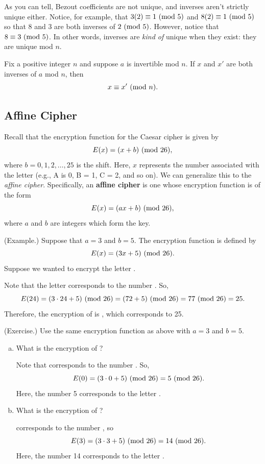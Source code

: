 \documentclass[letterpaper]{article}
\newcommand{\0}{\mathbf{0}}
\begin{document}
As you can tell, Bezout coefficients are not unique, and inverses aren't strictly unique either. Notice, for example, that $3(2) \equiv 1 \ (\mathrm{mod}\ 5)$ and $8(2) \equiv 1 \ (\mathrm{mod}\ 5)$ so that $8$ and $3$ are both inverses of $2 \ (\mathrm{mod}\ 5)$. However, notice that $8 \equiv 3 \ (\mathrm{mod}\ 5)$. In other words, inverses are \emph{kind of} unique when they exist: they are unique mod $n$. 

\begin{lemma}{}{}
    Fix a positive integer $n$ and suppose $a$ is invertible mod $n$. If $x$ and $x'$ are both inverses of $a$ mod $n$, then 
    \[x \equiv x' \ (\mathrm{mod}\ n).\]
\end{lemma}

\subsection{Affine Cipher}
Recall that the encryption function for the Caesar cipher is given by \[E(x) = (x + b) \ (\mathrm{mod}\ 26),\] where $b = 0, 1, 2, \hdots, 25$ is the shift. Here, $x$ represents the number associated with the letter (e.g., A is 0, B = 1, C = 2, and so on). We can generalize this to the \emph{affine cipher}. Specifically, an \textbf{affine cipher} is one whose encryption function is of the form \[E(x) = (ax + b) \ (\mathrm{mod}\ 26),\] where $a$ and $b$ are integers which form the key. 

\bigskip 

\begin{mdframed}
    (Example.) Suppose that $a = 3$ and $b = 5$. The encryption function is defined by \[E(x) = (3x + 5) \ (\mathrm{mod}\ 26).\] Suppose we wanted to encrypt the letter . 

    \bigskip 

    Note that the letter  corresponds to the number . So, 
    \[E(24) = (3 \cdot 24 + 5) \ (\mathrm{mod}\ 26) = (72 + 5) \ (\mathrm{mod}\ 26) = 77 \ (\mathrm{mod}\ 26) = 25.\]
    Therefore, the encryption of  is , which corresponds to 25.
\end{mdframed}

\begin{mdframed}[nobreak=true]
    (Exercise.) Use the same encryption function as above with $a = 3$ and $b = 5$.

    \begin{enumerate}[(a)]
        \item What is the encryption of ?
        \begin{mdframed}
            Note that  corresponds to the number . So, 
            \[E(0) = (3 \cdot 0 + 5) \ (\mathrm{mod}\ 26) = 5 \ (\mathrm{mod}\ 26).\]
            Here, the number 5 corresponds to the letter .
        \end{mdframed}
        \item What is the encryption of ?
        \begin{mdframed}
             corresponds to the number , so 
            \[E(3) = (3 \cdot 3 + 5) \ (\mathrm{mod}\ 26) = 14 \ (\mathrm{mod}\ 26).\]
            Here, the number 14 corresponds to the letter .
        \end{mdframed}
    \end{enumerate}
\end{mdframed}
\end{document}
